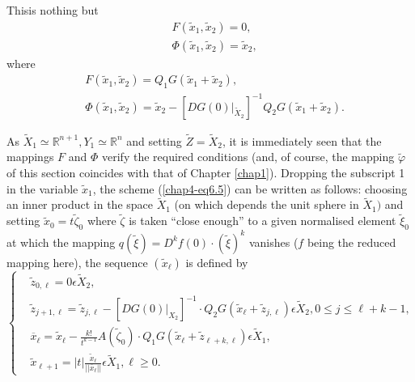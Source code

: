 This\pageoriginale is nothing but
\begin{align*}
& F(\widetilde{x}_{1}, \widetilde{x}_{2}) = 0,\\
& \Phi(\widetilde{x}_{1}, \widetilde{x}_{2}) = \widetilde{x}_{2},
\end{align*}
where
\begin{align*}
& F(\widetilde{x}_{1}, \widetilde{x}_{2}) = Q_{1}G(\widetilde{x}_{1} +
  \widetilde{x}_{2}),\tag{6.6}\label{chap4-eq6.6}\\
& \Phi(\widetilde{x}_{1}, \widetilde{x}_{2}) = \widetilde{x}_{2} -
            [DG(0) |_{\widetilde{X}_{2}}]^{-1}
            Q_{2}G(\widetilde{x}_{1} +
            \widetilde{x}_{2}).\tag{6.7}\label{chap4-eq6.7} 
\end{align*}

As $\widetilde{X}_{1} \simeq \mathbb{R}^{n+1}, Y_{1} \simeq
\mathbb{R}^{n}$ and setting $\widetilde{Z} = \widetilde{X}_{2}$, it is
immediately seen that the mappings $F$ and $\Phi$ verify the required
conditions (and, of course, the mapping $\widetilde{\varphi}$ of this
section coincides with that of Chapter \ref{chap1}). Dropping the
subscript 1 in the variable $\widetilde{x}_{1}$, the scheme
(\ref{chap4-eq6.5}) can be written as follows: choosing an inner
product in the space $\widetilde{X}_{1}$ (on which depends the unit
sphere in $\widetilde{X}_{1})$ and setting $\widetilde{x}_{0} =
t\widetilde{\zeta}_{0}$ where $\widetilde{\zeta}$ is taken ``close
enough'' to a given normalised element $\widetilde{\xi}_{0}$ at which
the mapping $q(\widetilde{\xi}) = D^{k}f(0) \cdot
(\widetilde{\xi})^{k}$ vanishes ($f$ being the reduced mapping here),
the sequence $(\widetilde{x}_{\ell})$ is defined by
\begin{equation*}
\begin{cases}
& \widetilde{z}_{0, \ell} = 0 \epsilon \widetilde{X}_{2},\\
& \widetilde{z}_{j + 1, \ell} = \widetilde{z}_{j, \ell} - [DG(0)
    |_{X_{2}}]^{-1} \cdot Q_{2}G(\widetilde{x}_{\ell} +
  \widetilde{z}_{j, \ell}) \epsilon \widetilde{X}_{2}, 0 \leq j \leq
  \ell + k - 1,\\
& \overline{x}_{\ell} = \widetilde{x}_{\ell} - \frac{k!}{t^{k-1}}
  A(\widetilde{\zeta}_{0}) \cdot Q_{1}G(\widetilde{x}_{\ell} +
  \widetilde{z}_{\ell+k, \ell}) \epsilon \widetilde{X}_{1},\\
& \widetilde{x}_{\ell + 1} = |t|
  \frac{\tilde{x}_{\ell}}{||\overline{x}_{\ell}||} \epsilon \widetilde{X}_{1},
  \ell \geq 0.
\end{cases}\tag{6.8}\label{chap4-eq6.8}
\end{equation*}


